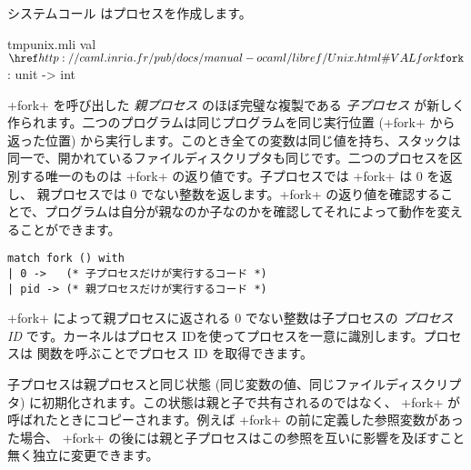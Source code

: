 システムコール  はプロセスを作成します。
%
\begin{listingcodefile}{tmpunix.mli}
val $\libvalue{Unix}{fork}$ : unit -> int
\end{listingcodefile}
%
\ml+fork+ を呼び出した \emph{親プロセス} のほぼ完璧な複製である \emph{子プロセス} が新しく作られます。二つのプログラムは同じプログラムを同じ実行位置 (\ml+fork+ から返った位置) から実行します。このとき全ての変数は同じ値を持ち、スタックは同一で、開かれているファイルディスクリプタも同じです。二つのプロセスを区別する唯一のものは \ml+fork+ の返り値です。子プロセスでは \ml+fork+ は 0 を返し、 親プロセスでは 0 でない整数を返します。\ml+fork+ の返り値を確認することで、プログラムは自分が親なのか子なのかを確認してそれによって動作を変えることができます。
%
\begin{lstlisting}
match fork () with
| 0 ->   (* 子プロセスだけが実行するコード *)
| pid -> (* 親プロセスだけが実行するコード *)
\end{lstlisting}
%
\ml+fork+ によって親プロセスに返される 0 でない整数は子プロセスの \emph{プロセス ID} です。カーネルはプロセス IDを使ってプロセスを一意に識別します。プロセスは  関数を呼ぶことでプロセス ID を取得できます。

子プロセスは親プロセスと同じ状態 (同じ変数の値、同じファイルディスクリプタ) に初期化されます。この状態は親と子で共有されるのではなく、 \ml+fork+ が呼ばれたときにコピーされます。例えば \ml+fork+ の前に定義した参照変数があった場合、 \ml+fork+ の後には親と子プロセスはこの参照を互いに影響を及ぼすこと無く独立に変更できます。

